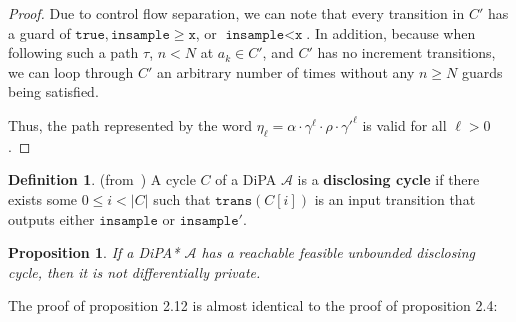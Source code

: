 \documentclass[12pt]{article}
\newcommand{\gguard}{\texttt{insample}\geq \texttt{x}}
\newcommand{\lguard}{\texttt{insample} < \texttt{x}}
\newtheorem{prop}[thm]{Proposition}
\theoremstyle{definition}
\newtheorem{defn}[thm]{Definition}
\begin{document}
\begin{proof}
	Due to control flow separation, we can note that every transition in $C'$ has a guard of $\texttt{true}, \gguard$, or $\lguard$. In addition, because when following such a path $\tau$, $n < N$ at $a_k \in C'$, and $C'$ has no increment transitions, we can loop through $C'$ an arbitrary number of times without any $n \geq N$ guards being satisfied.

	Thus, the path represented by the word $\eta_\ell = \alpha \cdot \gamma^\ell\cdot \rho \cdot \gamma'^\ell$ is valid for all $\ell > 0$.
\end{proof}


\begin{defn} (from~\cite{chadhaLinearTimeDecidability2021}) A cycle $C$ of a DiPA $\mathcal{A}$ is a \textbf{disclosing cycle} if there exists some $0\leq i <|C|$ such that $\texttt{trans}(C[i])$ is an input transition that outputs either $\texttt{insample}$ or $\texttt{insample}'$.

\end{defn}


\begin{prop}
	If a DiPA* $\mathcal{A}$ has a reachable feasible unbounded disclosing cycle, then it is not differentially private.
\end{prop}


The proof of proposition 2.12 is almost identical to the proof of proposition 2.4: 
\end{document}
